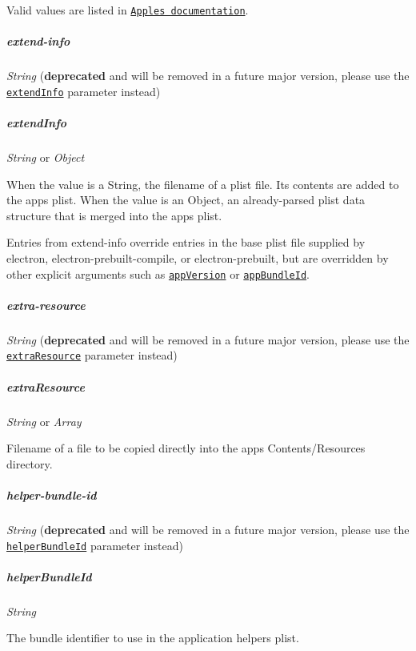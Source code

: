 Valid values are listed in \href{https://developer.apple.com/library/ios/documentation/General/Reference/InfoPlistKeyReference/Articles/LaunchServicesKeys.html#//apple_ref/doc/uid/TP40009250-SW8}{\tt Apple\textquotesingle{}s documentation}.

\subparagraph*{{\ttfamily extend-\/info}}

{\itshape String} ({\bfseries deprecated} and will be removed in a future major version, please use the \href{#extendinfo}{\tt {\ttfamily extend\+Info}} parameter instead)

\subparagraph*{{\ttfamily extend\+Info}}

{\itshape String} or {\itshape Object}

When the value is a {\ttfamily String}, the filename of a plist file. Its contents are added to the app\textquotesingle{}s plist. When the value is an {\ttfamily Object}, an already-\/parsed plist data structure that is merged into the app\textquotesingle{}s plist.

Entries from {\ttfamily extend-\/info} override entries in the base plist file supplied by {\ttfamily electron}, {\ttfamily electron-\/prebuilt-\/compile}, or {\ttfamily electron-\/prebuilt}, but are overridden by other explicit arguments such as \href{#appversion}{\tt {\ttfamily app\+Version}} or \href{#appbundleid}{\tt {\ttfamily app\+Bundle\+Id}}.

\subparagraph*{{\ttfamily extra-\/resource}}

{\itshape String} ({\bfseries deprecated} and will be removed in a future major version, please use the \href{#extraresource}{\tt {\ttfamily extra\+Resource}} parameter instead)

\subparagraph*{{\ttfamily extra\+Resource}}

{\itshape String} or {\itshape Array}

Filename of a file to be copied directly into the app\textquotesingle{}s {\ttfamily Contents/\+Resources} directory.

\subparagraph*{{\ttfamily helper-\/bundle-\/id}}

{\itshape String} ({\bfseries deprecated} and will be removed in a future major version, please use the \href{#helperbundleid}{\tt {\ttfamily helper\+Bundle\+Id}} parameter instead)

\subparagraph*{{\ttfamily helper\+Bundle\+Id}}

{\itshape String}

The bundle identifier to use in the application helper\textquotesingle{}s plist.

